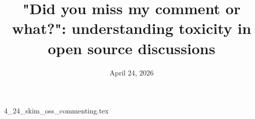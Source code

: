 \documentclass{article}      %
\title{"Did you miss my comment or what?": understanding toxicity in open source discussions}  %
\date{April 24, 2026}
\begin{document}

\maketitle                   %



{4_24_skim_oss_commenting.tex}
\printbibliography
\end{document}
